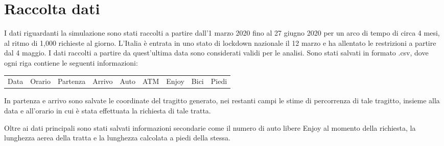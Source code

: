 \section{Raccolta dati}

I dati riguardanti la simulazione sono stati raccolti a partire dall'1 marzo 2020 fino al 27 giugno 2020 per un arco di tempo di circa 4 mesi, al ritmo di 1,000 richieste al giorno. L'Italia è entrata in uno stato di lockdown nazionale il 12 marzo e ha allentato le restrizioni a partire dal 4 maggio. I dati raccolti a partire da quest'ultima data sono considerati validi per le analisi. Sono stati salvati in formato .csv, dove ogni riga contiene le seguenti informazioni:

\begin{center}
	\begin{tabular}{ c c c c c c c c c  }
		Data & Orario & Partenza & Arrivo & Auto & ATM & Enjoy & Bici & Piedi
	\end{tabular}
\end{center}

In partenza e arrivo sono salvate le coordinate del tragitto generato, nei restanti campi le stime di percorrenza di tale tragitto, insieme alla data e all'orario in cui è stata effettuata la richiesta di tale tratta.

Oltre ai dati principali sono stati salvati informazioni secondarie come il numero di auto libere Enjoy al momento della richiesta, la lunghezza aerea della tratta e la lunghezza calcolata a piedi della stessa.